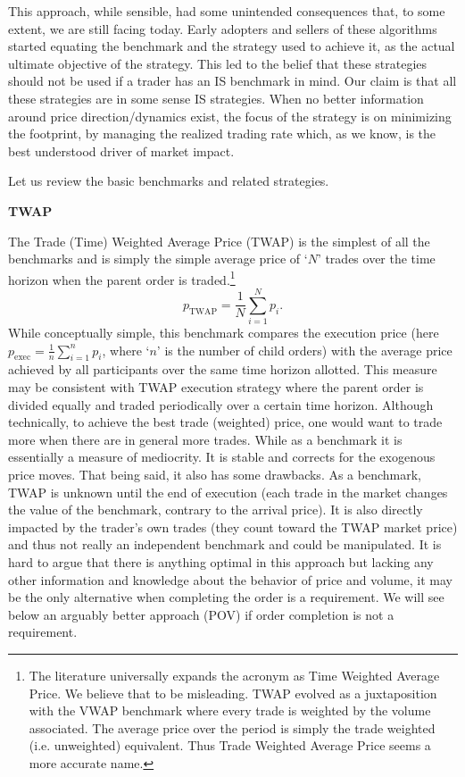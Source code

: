 This approach, while sensible, had some unintended consequences that, to some extent, we are still facing today. Early adopters and sellers of these algorithms started equating the benchmark and the strategy used to achieve it, as the actual ultimate objective of the strategy. This led to the belief that these strategies should not be used if a trader has an IS benchmark in mind. Our claim is that all these strategies are in some sense IS strategies. When no better information around price direction/dynamics exist, the focus of the strategy is on minimizing the footprint, by managing the realized trading rate which, as we know, is the best understood driver of market impact.


Let us review the basic benchmarks and related strategies. \twomedskip


\noindent\textbf{TWAP} \twomedskip

The Trade (Time) Weighted Average Price (TWAP)  is the simplest of all the benchmarks and is simply the simple average price of `$N$' trades over the time horizon when the parent order is traded.\footnote{The literature universally  expands the acronym as Time Weighted Average Price. We believe that to be misleading. TWAP evolved as a juxtaposition with the VWAP benchmark where every trade is weighted by the volume associated. The average price over the period is simply the trade weighted (i.e. unweighted) equivalent. Thus Trade Weighted Average Price seems a more accurate name.}
        \begin{equation}
        p_\text{TWAP}= \frac{1}{N} \sum_{i=1}^N {p_i}.
        \end{equation}
While conceptually simple, this benchmark compares the execution price (here $p_\text{exec}= \frac{1}{n} \sum_{i=1}^n p_i$, where `$n$' is the number of child orders) with the average price achieved by all participants over the same time horizon allotted. This measure may be consistent with TWAP execution strategy where the parent order is divided equally and traded periodically over a certain time horizon. Although technically, to achieve the best trade (weighted) price, one would want to trade more when there are in general more trades. While  as a benchmark it is essentially a measure of mediocrity. It is stable and corrects for the exogenous price moves. That being said, it also has some drawbacks. As a benchmark, TWAP is unknown until the end of execution (each trade in the market changes the value of the benchmark, contrary to the arrival price). It is also directly impacted by the trader's own trades (they count toward the TWAP market price) and thus not really an independent benchmark and could be manipulated. 
It is hard to argue that there is anything optimal in this approach but lacking any other information and knowledge about the behavior of price and volume, it may be the only alternative when completing the order is a requirement. We will see below an arguably better approach (POV) if order completion is not a requirement. 


